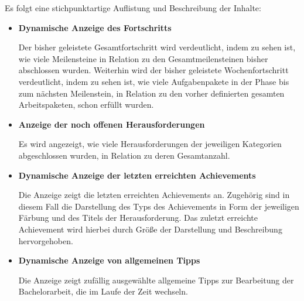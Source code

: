 \documentclass[bibliography=totoc,listof=totoc,BCOR=5mm,DIV=12,oneside]{scrbook}
\begin{document}
\par \medskip Es folgt eine stichpunktartige Auflistung und Beschreibung der Inhalte:
\begin{itemize}
\item \textbf{Dynamische Anzeige des Fortschritts}
\par Der bisher geleistete Gesamtfortschritt wird verdeutlicht, indem zu sehen ist, wie viele Meilensteine in Relation zu den Gesamtmeilensteinen bisher abschlossen wurden. Weiterhin wird der bisher geleistete Wochenfortschritt verdeutlicht, indem zu sehen ist, wie viele Aufgabenpakete in der Phase bis zum nächsten Meilenstein, in Relation zu den vorher definierten gesamten Arbeitspaketen, schon erfüllt wurden.
\item \textbf{Anzeige der noch offenen Herausforderungen}
\par Es wird angezeigt, wie viele Herausforderungen der jeweiligen Kategorien abgeschlossen wurden, in Relation zu deren Gesamtanzahl.
\item \textbf{Dynamische Anzeige der letzten erreichten Achievements}
\par Die Anzeige zeigt die letzten erreichten Achievements an. Zugehörig sind in diesem Fall die Darstellung des Typs des Achievements in Form der jeweiligen Färbung und des Titels der Herausforderung. Das zuletzt erreichte Achievement wird hierbei durch Größe der Darstellung und Beschreibung hervorgehoben.
\item \textbf{Dynamische Anzeige von allgemeinen Tipps}
\par Die Anzeige zeigt zufällig ausgewählte allgemeine Tipps zur Bearbeitung der Bachelorarbeit, die im Laufe der Zeit wechseln. 
\end{itemize}
\end{document}
